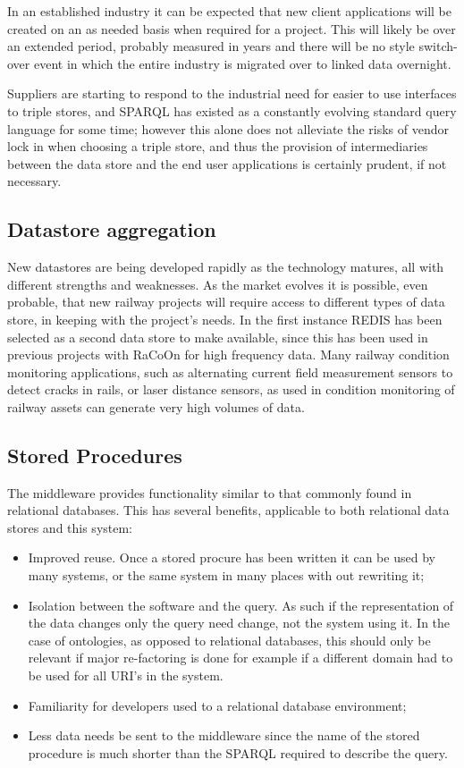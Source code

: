 In an established industry it can be expected that new client applications will be created on an as needed basis when required for a project. This will likely be over an extended period, probably measured in years and there will be no  style switch-over event in which the entire industry is migrated over to linked data overnight. 

Suppliers are starting to respond to the industrial need for easier to use interfaces to triple stores, and SPARQL has existed as a constantly evolving standard query language for some time; however this alone does not alleviate the risks of vendor lock in when choosing a triple store, and thus the provision of intermediaries between the data store and the end user applications is certainly prudent, if not necessary.

\subsection{Datastore aggregation}
New datastores are being developed rapidly as the technology matures, all with different strengths and weaknesses. As the market evolves it is possible, even probable, that new railway projects will require access to different types of data store, in keeping with the project's needs. In the first instance REDIS has been selected as a second data store to make available, since this has been used in previous projects with RaCoOn for high frequency data. Many railway condition monitoring applications, such as alternating current field measurement sensors to detect cracks in rails, or laser distance sensors, as used in condition monitoring of railway assets can generate very high volumes of data.
\subsection{Stored Procedures}
The middleware provides  functionality similar to that commonly found in relational databases. This has several benefits, applicable to both relational data stores and this system:

\begin{itemize}
    \item Improved reuse. Once a stored procure has been written it can be used by many systems, or the same system in many places with out rewriting it;
   \item Isolation between the software and the query. As such if the representation of the data changes only the query need change, not the system using it. In the case of ontologies, as opposed to relational databases, this should only be relevant if major re-factoring is done for example if a different domain had to be used for all URI's in the system.
    \item Familiarity for developers used to a relational database environment;    
    \item Less data needs be sent to the middleware since the name of the stored procedure is much shorter than the SPARQL required to describe the query. 
\end{itemize}


